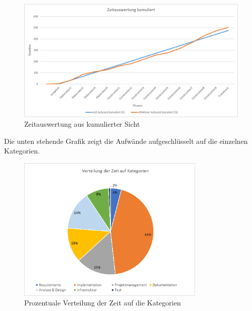  \begin{figure}[H]
 	\centering
 	\includegraphics[width=1\textwidth]
 	{Images/ZeitauswertungKumuliert.png}
 	\caption{Zeitauswertung aus kumulierter Sicht}
 \end{figure}

Die unten stehende Grafik zeigt die Aufwände aufgeschlüsselt auf die einzelnen Kategorien.

\begin{figure}[H]
	\centering
	\includegraphics[width=0.8\textwidth]
	{Images/ZeitauswertungKategorien.png}
	\caption{Prozentuale Verteilung der Zeit auf die Kategorien}
\end{figure}
